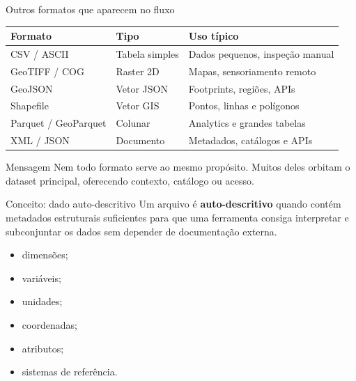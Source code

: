 \documentclass[aspectratio=169]{beamer}
\begin{document}
\begin{frame}{Outros formatos que aparecem no fluxo}
\begin{table}
\centering
\small
\begin{tabular}{lll}
\toprule
Formato & Tipo & Uso típico \\
\midrule
CSV / ASCII & Tabela simples & Dados pequenos, inspeção manual \\
GeoTIFF / COG & Raster 2D & Mapas, sensoriamento remoto \\
GeoJSON & Vetor JSON & Footprints, regiões, APIs \\
Shapefile & Vetor GIS & Pontos, linhas e polígonos \\
Parquet / GeoParquet & Colunar & Analytics e grandes tabelas \\
XML / JSON & Documento & Metadados, catálogos e APIs \\
\bottomrule
\end{tabular}
\end{table}

\vspace{0.3cm}

\begin{block}{Mensagem}
Nem todo formato serve ao mesmo propósito. Muitos deles orbitam o dataset principal, oferecendo contexto, catálogo ou acesso.
\end{block}
\end{frame}

\begin{frame}{Conceito: dado auto-descritivo}
\Large
Um arquivo é \textbf{auto-descritivo} quando contém metadados estruturais suficientes para que uma ferramenta consiga interpretar e subconjuntar os dados sem depender de documentação externa.

\vspace{0.4cm}

\begin{itemize}
  \item dimensões;
  \item variáveis;
  \item unidades;
  \item coordenadas;
  \item atributos;
  \item sistemas de referência.
\end{itemize}
\end{frame}
\end{document}
